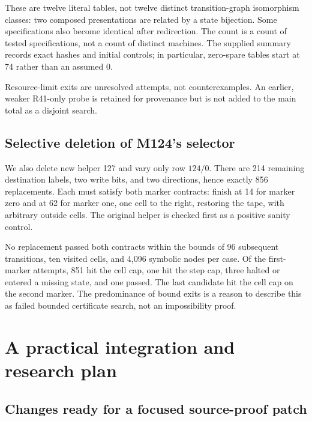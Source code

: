 \documentclass[11pt]{article}
\theoremstyle{remark}\newtheorem{remark}[theorem]{Remark}
\begin{document}
These are twelve literal tables, not twelve distinct transition-graph isomorphism classes: two composed presentations are related by a state bijection. Some specifications also become identical after redirection. The count is a count of tested specifications, not a count of distinct machines. The supplied summary records exact hashes and initial controls; in particular, zero-spare tables start at 74 rather than an assumed 0.

Resource-limit exits are unresolved attempts, not counterexamples. An earlier, weaker R41-only probe is retained for provenance but is not added to the main total as a disjoint search.

\subsection{Selective deletion of M124's selector}

We also delete new helper 127 and vary only row $124/0$. There are 214 remaining destination labels, two write bits, and two directions, hence exactly 856 replacements. Each must satisfy both marker contracts: finish at 14 for marker zero and at 62 for marker one, one cell to the right, restoring the tape, with arbitrary outside cells. The original helper is checked first as a positive sanity control.

No replacement passed both contracts within the bounds of 96 subsequent transitions, ten visited cells, and 4,096 symbolic nodes per case. Of the first-marker attempts, 851 hit the cell cap, one hit the step cap, three halted or entered a missing state, and one passed. The last candidate hit the cell cap on the second marker. The predominance of bound exits is a reason to describe this as failed bounded certificate search, not an impossibility proof.

\section{A practical integration and research plan}

\subsection{Changes ready for a focused source-proof patch}
\end{document}
